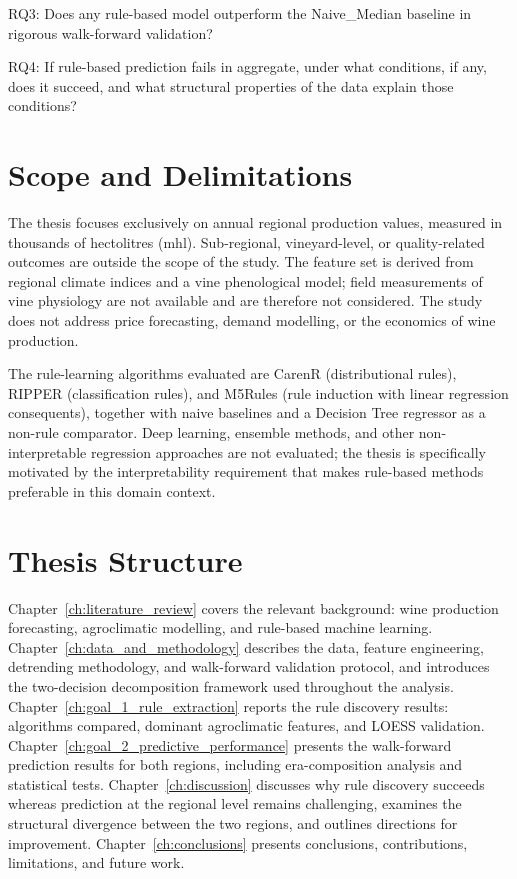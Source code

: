 \textbullet{}  RQ3: Does any rule-based model outperform the Naive\_Median baseline in rigorous walk-forward validation?

\textbullet{}  RQ4: If rule-based prediction fails in aggregate, under what conditions, if any, does it succeed, and what structural properties of the data explain those conditions?


\section{Scope and Delimitations}\label{sec:scope_and_delimitations}

The thesis focuses exclusively on annual regional production values, measured in thousands of hectolitres (mhl). Sub-regional, vineyard-level, or quality-related outcomes are outside the scope of the study. The feature set is derived from regional climate indices and a vine phenological model; field measurements of vine physiology are not available and are therefore not considered. The study does not address price forecasting, demand modelling, or the economics of wine production.

The rule-learning algorithms evaluated are CarenR (distributional rules), RIPPER (classification rules), and M5Rules (rule induction with linear regression consequents), together with naive baselines and a Decision Tree regressor as a non-rule comparator. Deep learning, ensemble methods, and other non-interpretable regression approaches are not evaluated; the thesis is specifically motivated by the interpretability requirement that makes rule-based methods preferable in this domain context.


\section{Thesis Structure}\label{sec:thesis_structure}

Chapter~\ref{ch:literature_review} covers the relevant background: wine production forecasting, agroclimatic modelling, and rule-based machine learning. Chapter~\ref{ch:data_and_methodology} describes the data, feature engineering, detrending methodology, and walk-forward validation protocol, and introduces the two-decision decomposition framework used throughout the analysis. Chapter~\ref{ch:goal_1_rule_extraction} reports the rule discovery results: algorithms compared, dominant agroclimatic features, and LOESS validation. Chapter~\ref{ch:goal_2_predictive_performance} presents the walk-forward prediction results for both regions, including era-composition analysis and statistical tests. Chapter~\ref{ch:discussion} discusses why rule discovery succeeds whereas prediction at the regional level remains challenging, examines the structural divergence between the two regions, and outlines directions for improvement. Chapter~\ref{ch:conclusions} presents conclusions, contributions, limitations, and future work.
